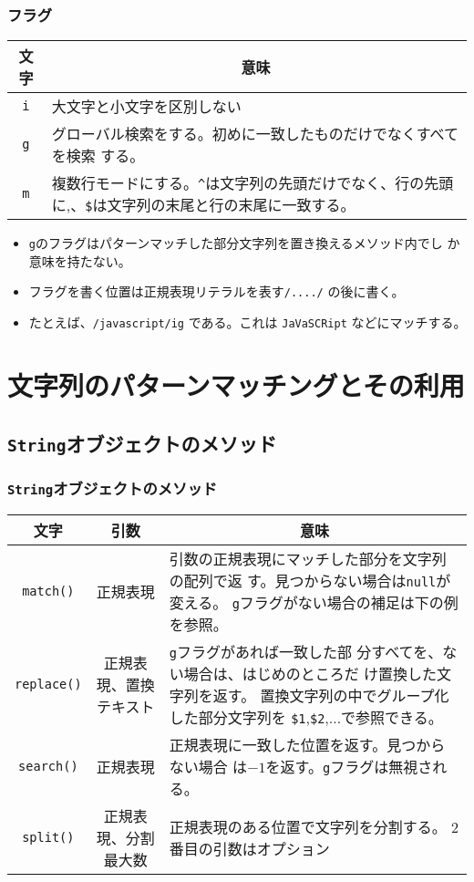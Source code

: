 \begin{frame}[containsverbatim]
 \frametitle{フラグ}
\begin{center} 
 \begin{tabular}{|c|m{}|}\hline
  文字&\multicolumn{1}{c|}{意味}\\\hline
\Verb+i+&大文字と小文字を区別しない\\\hline
\Verb+g+&グローバル検索をする。初めに一致したものだけでなくすべてを検索
      する。\\\hline
\Verb+m+&複数行モードにする。\Verb+^+は文字列の先頭だけでなく、行の先頭
      に,、\Verb+$+は文字列の末尾と行の末尾に一致する。\\\hline
\end{tabular}
\end{center}
\begin{itemize}
 \item \Verb+g+のフラグはパターンマッチした部分文字列を置き換えるメソッド内でし
か意味を持たない。
 \item フラグを書く位置は正規表現リテラルを表す\Verb+/..../+ の後に書く。
 \item たとえば、\Verb+/javascript/ig+ である。これは \Verb+JaVaSCRipt+
       などにマッチする。
\end{itemize}
\end{frame}
\section{文字列のパターンマッチングとその利用}
\subsection{\protect\texttt{String}オブジェクトのメソッド}
\begin{frame}[containsverbatim]
 \frametitle{\protect\texttt{String}オブジェクトのメソッド}
\begin{center}
 \begin{tabular}{|c|c|m{}|}\hline
  文字&\multicolumn{1}{c|}{引数}&\multicolumn{1}{c|}{意味}\\\hline
\Verb+match()+&正規表現&引数の正規表現にマッチした部分を文字列の配列で返
	  す。見つからない場合は\Verb+null+が変える。
          \Verb+g+フラグがない場合の補足は下の例を参照。\\\hline
\Verb+replace()+&\multicolumn{1}{m{6zw}|}{正規表現、\newline 置換テキスト}&\Verb+g+フラグがあれば一致した部
	  分すべてを、ない場合は、はじめのところだ
	  け置換した文字列を返す。\newline
          置換文字列の中でグループ化した部分文字列を
	  \Verb+$1+,\Verb+$2+,...で参照できる。\\\hline
\Verb+search()+&正規表現&正規表現に一致した位置を返す。見つからない場合
	  は$-1$を返す。\Verb+g+フラグは無視される。\\\hline
\Verb+split()+&\multicolumn{1}{m{5zw}|}{正規表現、\newline 分割最大数}&正規表現のある位置で文字列を分割する。
	  2番目の引数はオプション\\\hline
\end{tabular}
\end{center}
\end{frame}
